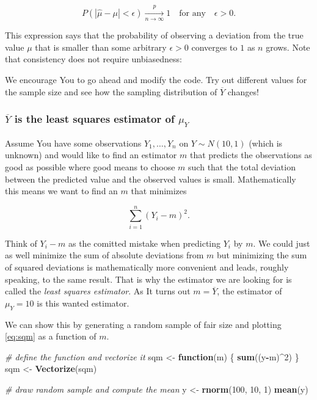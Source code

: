 \documentclass[]{book}
\newenvironment{Shaded}{\begin{snugshade}}{\end{snugshade}}
\newcommand{\KeywordTok}[1]{\textcolor[rgb]{0.13,0.29,0.53}{\textbf{#1}}}
\newcommand{\DecValTok}[1]{\textcolor[rgb]{0.00,0.00,0.81}{#1}}
\newcommand{\StringTok}[1]{\textcolor[rgb]{0.31,0.60,0.02}{#1}}
\newcommand{\CommentTok}[1]{\textcolor[rgb]{0.56,0.35,0.01}{\textit{#1}}}
\newcommand{\ControlFlowTok}[1]{\textcolor[rgb]{0.13,0.29,0.53}{\textbf{#1}}}
\newcommand{\OperatorTok}[1]{\textcolor[rgb]{0.81,0.36,0.00}{\textbf{#1}}}
\newcommand{\NormalTok}[1]{#1}
\theoremstyle{definition}
\theoremstyle{definition}
\theoremstyle{definition}
\theoremstyle{remark}
\begin{document}
\[ P(|\hat{\mu} - \mu|<\epsilon) \xrightarrow[n \rightarrow \infty]{p} 1 \quad \text{for any}\quad\epsilon>0.\]

This expression says that the probability of observing a deviation from
the true value \(\mu\) that is smaller than some arbitrary
\(\epsilon > 0\) converges to \(1\) as \(n\) grows. Note that
consistency does not require unbiasedness:

We encourage You to go ahead and modify the code. Try out different
values for the sample size and see how the sampling distribution of
\(\overline{Y}\) changes!

\subsubsection*{\texorpdfstring{\(\overline{Y}\) is the least squares
estimator of
\(\mu_Y\)}{\textbackslash{}overline\{Y\} is the least squares estimator of \textbackslash{}mu\_Y}}\label{overliney-is-the-least-squares-estimator-of-mu_y}

Assume You have some observations \(Y_1,\dots,Y_n\) on
\(Y \sim N(10,1)\) (which is unknown) and would like to find an
estimator \(m\) that predicts the observations as good as possible where
good means to choose \(m\) such that the total deviation between the
predicted value and the observed values is small. Mathematically this
means we want to find an \(m\) that minimizes

\begin{equation}
  \sum_{i=1}^n (Y_i - m)^2. \label{eq:sqm}
\end{equation}

Think of \(Y_i - m\) as the comitted mistake when predicting \(Y_i\) by
\(m\). We could just as well minimize the sum of absolute deviations
from \(m\) but minimizing the sum of squared deviations is
mathematically more convenient and leads, roughly speaking, to the same
result. That is why the estimator we are looking for is called the
\emph{least squares estimator}. As It turns out \(m = \overline{Y}\),
the estimator of \(\mu_Y=10\) is this wanted estimator.

We can show this by generating a random sample of fair size and plotting
\eqref{eq:sqm} as a function of \(m\).

\begin{Shaded}
\begin{Highlighting}[]
\CommentTok{# define the function and vectorize it}
\NormalTok{sqm <-}\StringTok{ }\ControlFlowTok{function}\NormalTok{(m) \{}
 \KeywordTok{sum}\NormalTok{((y}\OperatorTok{-}\NormalTok{m)}\OperatorTok{^}\DecValTok{2}\NormalTok{)}
\NormalTok{\}}
\NormalTok{sqm <-}\StringTok{ }\KeywordTok{Vectorize}\NormalTok{(sqm)}

\CommentTok{# draw random sample and compute the mean}
\NormalTok{y <-}\StringTok{ }\KeywordTok{rnorm}\NormalTok{(}\DecValTok{100}\NormalTok{, }\DecValTok{10}\NormalTok{, }\DecValTok{1}\NormalTok{)}
\KeywordTok{mean}\NormalTok{(y)}
\end{Highlighting}
\end{Shaded}
\end{document}
